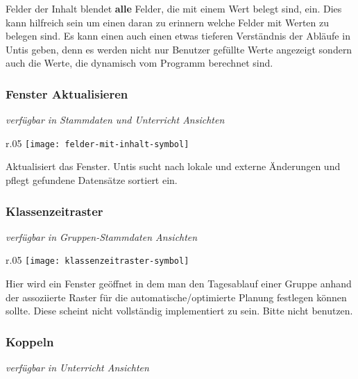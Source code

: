 \noindent
Felder der Inhalt blendet \textbf{alle} Felder, die mit einem Wert belegt sind, ein. Dies kann hilfreich sein um einen daran zu erinnern welche Felder mit Werten zu belegen sind. Es kann einen auch einen etwas tieferen Verständnis der Abläufe in Untis geben, denn es werden nicht nur Benutzer gefüllte Werte angezeigt sondern auch die Werte, die dynamisch vom Programm berechnet sind.\\

\subsubsection{Fenster Aktualisieren}
{\small\textit{verfügbar in Stammdaten und Unterricht Ansichten\\}\par}

\begin{wrapfigure}{r}{.05\textwidth}
	\vspace{-50pt}
	\texttt{[image: felder-mit-inhalt-symbol]}
	\vspace{-35pt}
\end{wrapfigure}

\noindent
Aktualisiert das Fenster. Untis sucht nach lokale und externe Änderungen und pflegt gefundene Datensätze sortiert ein. \\

\subsubsection{Klassenzeitraster}
{\small\textit{verfügbar in Gruppen-Stammdaten Ansichten\\}\par}

\begin{wrapfigure}{r}{.05\textwidth}
	\vspace{-50pt}
	\texttt{[image: klassenzeitraster-symbol]}
	\vspace{-35pt}
\end{wrapfigure}

\noindent
Hier wird ein Fenster geöffnet in dem man den Tagesablauf einer Gruppe anhand der assoziierte Raster für die automatische/optimierte Planung festlegen können sollte. Diese scheint nicht vollständig implementiert zu sein. Bitte nicht benutzen.\\

\subsubsection{Koppeln}
{\small\textit{verfügbar in Unterricht Ansichten\\}\par}

